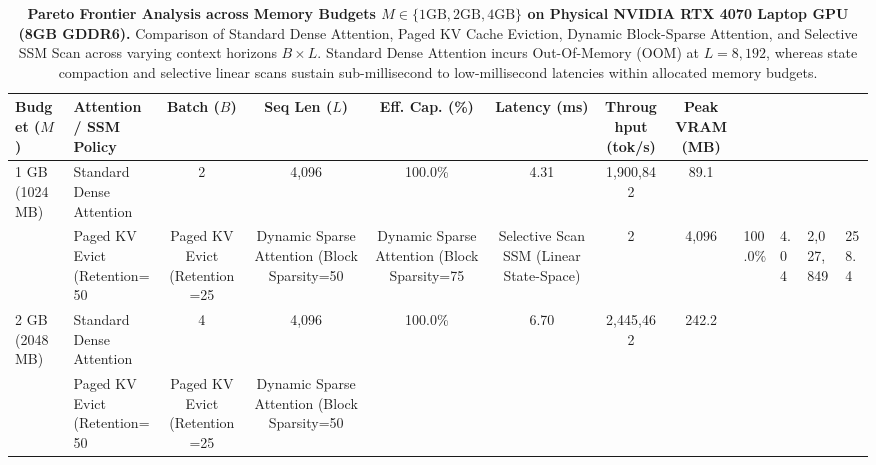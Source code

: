 \documentclass[journal]{IEEEtran}
\begin{document}
\begin{table}[t]
\centering
\small
\caption{\textbf{Pareto Frontier Analysis across Memory Budgets $M \in \{1\text{GB}, 2\text{GB}, 4\text{GB}\}$ on Physical NVIDIA RTX 4070 Laptop GPU (8GB GDDR6).} Comparison of Standard Dense Attention, Paged KV Cache Eviction, Dynamic Block-Sparse Attention, and Selective SSM Scan across varying context horizons $B \times L$. Standard Dense Attention incurs Out-Of-Memory (OOM) at $L=8{,}192$, whereas state compaction and selective linear scans sustain sub-millisecond to low-millisecond latencies within allocated memory budgets.}
\label{tab:pareto_frontier_benchmarks}
\begin{tabular}{llcccccc}
\toprule
\textbf{Budget ($M$)} & \textbf{Attention / SSM Policy} & \textbf{Batch ($B$)} & \textbf{Seq Len ($L$)} & \textbf{Eff. Cap. (\%)} & \textbf{Latency (ms)} & \textbf{Throughput (tok/s)} & \textbf{Peak VRAM (MB)} \\
 GB (1024 MB)   & Standard Dense Attention                      & 2 & 4,096 & 100.0\% & 4.31 & 1,900,842 & 89.1 \\
                 & Paged KV Evict (Retention=50%
                 & Paged KV Evict (Retention=25%
                 & Dynamic Sparse Attention (Block Sparsity=50%
                 & Dynamic Sparse Attention (Block Sparsity=75%
                 & Selective Scan SSM (Linear State-Space)       & 2 & 4,096 & 100.0\% & 4.04 & 2,027,849 & 258.4 \\
 GB (2048 MB)   & Standard Dense Attention                      & 4 & 4,096 & 100.0\% & 6.70 & 2,445,462 & 242.2 \\
                 & Paged KV Evict (Retention=50%
                 & Paged KV Evict (Retention=25%
                 & Dynamic Sparse Attention (Block Sparsity=50%

\end{tabular}
\end{table}
\end{document}
